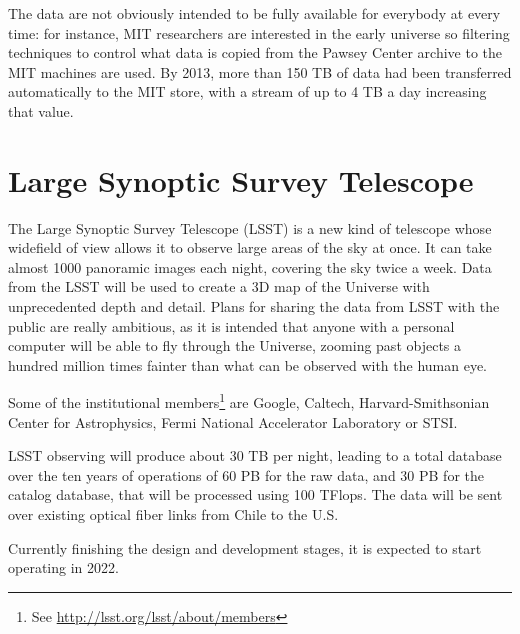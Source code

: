 The data are not obviously intended to be fully available for everybody at every time: for instance, MIT researchers are interested in the early universe so filtering techniques to control what data is copied from the Pawsey Center archive to the MIT machines are used. By 2013, more than 150 TB of data had been transferred automatically to the MIT store, with a stream of up to 4 TB a day increasing that value. 




\section{Large Synoptic Survey Telescope} %
\label{sec:large_synoptic_survey_telescope}

The Large Synoptic Survey Telescope (LSST) is a new kind of telescope whose widefield of view allows it to observe large areas of the sky at once. It can take almost 1000 panoramic images each night,
covering %
the sky twice a week. Data from
the
LSST will be used to create a 3D map of the Universe with unprecedented depth and detail. Plans for sharing the data from LSST with the public are really ambitious, as it is intended that anyone with a
personal computer %
will be able to %
fly through the Universe, zooming past objects a hundred million times fainter than
what
can be observed with the human eye. 

Some of the institutional members\footnote{See \url{http://lsst.org/lsst/about/members}} are Google, Caltech, Harvard-Smithsonian Center for Astrophysics, Fermi National Accelerator Laboratory or STSI.  


LSST observing will produce about 30 TB per night, leading to a total database over the ten years of operations of 60 PB for the raw data, and 30 PB for the catalog database, that will be processed using 100 TFlops. The data will be sent over existing optical fiber links from Chile to the U.S. 

Currently finishing the design and development stages, it is expected to start operating in 2022.

